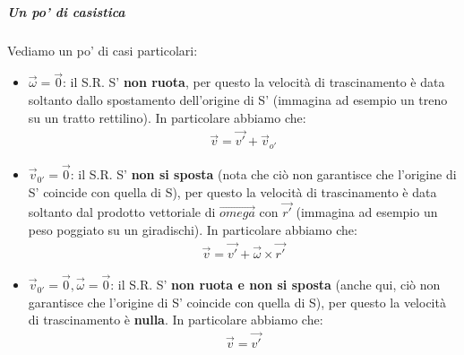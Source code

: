                 \subparagraph{Un po' di casistica}
                Vediamo un po' di casi particolari:
                \begin{itemize}
                    \item $\vec{\omega}=\vec{0}$: il S.R. S' \textbf{non ruota}, per questo la velocità di trascinamento è data soltanto dallo spostamento dell'origine di S' (immagina ad esempio un treno su un tratto rettilino). In particolare abbiamo che:
                    \begin{align*}
                        \vec{v}=\vec{v'}+\vec{v}_{o'}
                    \end{align*}
                    \item $\vec{v}_{0'}=\vec{0}$: il S.R. S' \textbf{non si sposta} (nota che ciò non garantisce che l'origine di S' coincide con quella di S), per questo la velocità di trascinamento è data soltanto dal prodotto vettoriale di $\vec{omega}$ con $\vec{r'}$ (immagina ad esempio un peso poggiato su un giradischi).
                    In particolare abbiamo che:
                    \begin{align*}
                        \vec{v}=\vec{v'}+\vec{\omega}\times\vec{r'}
                    \end{align*}
                    \item $\vec{v}_{0'}=\vec{0}, \vec{\omega}=\vec{0}$: il S.R. S' \textbf{non ruota e non si sposta} (anche qui, ciò non garantisce che l'origine di S' coincide con quella di S), per questo la velocità di trascinamento è \textbf{nulla}.
                    In particolare abbiamo che:
                    \begin{align*}
                        \vec{v}=\vec{v'}
                    \end{align*}
                \end{itemize}

